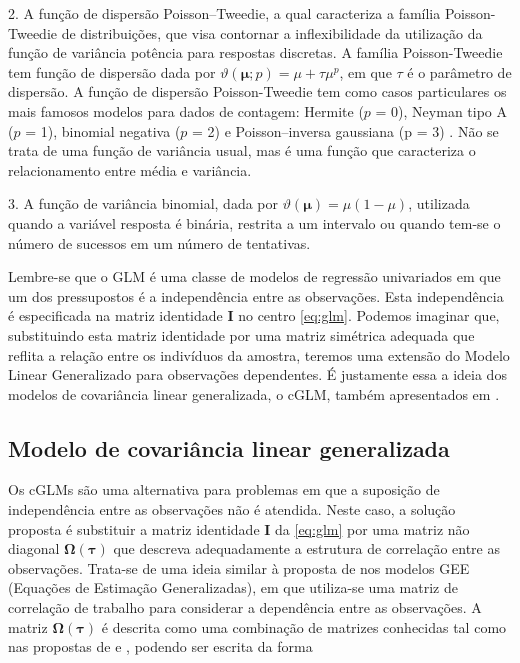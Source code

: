 2. A função de dispersão Poisson–Tweedie, a qual caracteriza a família Poisson-Tweedie de distribuições, que visa contornar a inflexibilidade da utilização da função de variância potência para  respostas discretas. A família Poisson-Tweedie tem função de dispersão dada por $\vartheta\left(\boldsymbol{\mu}; p\right) = \mu + \tau\mu^p$, em que $\tau$ é o parâmetro de dispersão. A função de dispersão Poisson-Tweedie tem como casos particulares os mais famosos modelos para dados de contagem: Hermite ($p$ = 0), Neyman tipo A ($p$ = 1), binomial negativa ($p$ = 2) e Poisson–inversa gaussiana (p = $3$) \citep{Jorgensen15}. Não se trata de uma função de variância usual, mas é uma função que caracteriza o relacionamento entre média e variância.

3. A função de variância binomial, dada por $\vartheta(\boldsymbol{\mu}) = \mu(1 - \mu)$, utilizada quando a variável resposta é binária, restrita a um intervalo ou quando tem-se o  número de sucessos em um número de tentativas.

Lembre-se que o GLM é uma classe de modelos de regressão univariados em que um dos pressupostos é a independência entre as observações. Esta independência é especificada na matriz identidade $\boldsymbol{I}$ no centro \autoref{eq:glm}. Podemos imaginar que, substituindo esta matriz identidade por uma matriz simétrica adequada que reflita a relação entre os indivíduos da amostra, teremos uma extensão do Modelo Linear Generalizado para observações dependentes. É justamente essa a ideia dos modelos de covariância linear generalizada, o cGLM, também apresentados em \citet{Bonat16}.

\subsection{Modelo de covariância linear generalizada}

Os cGLMs são uma alternativa para problemas em que a suposição de independência entre as observações não é atendida. Neste caso, a solução proposta é substituir a matriz identidade $\boldsymbol{I}$ da \autoref{eq:glm} por uma matriz não diagonal $\boldsymbol{\Omega({\tau})}$ que descreva adequadamente a estrutura de correlação entre as observações. Trata-se de uma ideia similar à proposta de \citet{Liang86} nos modelos GEE (Equações de Estimação Generalizadas), em que utiliza-se uma matriz de correlação de trabalho para considerar a dependência entre as observações. A matriz $\boldsymbol{\Omega({\tau})}$ é descrita como uma combinação de matrizes conhecidas tal como nas propostas de \citet{Anderson73} e \citet{Pourahmadi00}, podendo ser escrita da forma

